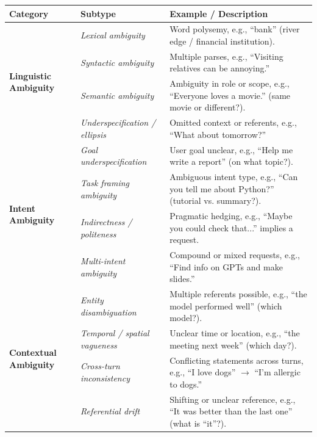 \documentclass[sigconf]{acmart}
\begin{document}
\iffalse
\begin{table}[t]
\centering
\small
\renewcommand{\arraystretch}{1.2}
\setlength{\tabcolsep}{8pt}
\begin{tabular}{p{3cm} p{4cm} p{7.5cm}}
\toprule
\textbf{Category} & \textbf{Subtype} & \textbf{Example / Description} \\
\midrule

\multirow{4}{*}{\textbf{Linguistic Ambiguity}} 
& \textit{Lexical ambiguity} & Word polysemy, e.g., ``bank'' (river edge / financial institution). \\
& \textit{Syntactic ambiguity} & Multiple parses, e.g., ``Visiting relatives can be annoying.'' \\
& \textit{Semantic ambiguity} & Ambiguity in role or scope, e.g., ``Everyone loves a movie.'' (same movie or different?). \\
& \textit{Underspecification / ellipsis} & Omitted context or referents, e.g., ``What about tomorrow?'' \\

\midrule

\multirow{4}{*}{\textbf{Intent Ambiguity}} 
& \textit{Goal underspecification} & User goal unclear, e.g., ``Help me write a report'' (on what topic?). \\
& \textit{Task framing ambiguity} & Ambiguous intent type, e.g., ``Can you tell me about Python?'' (tutorial vs. summary?). \\
& \textit{Indirectness / politeness} & Pragmatic hedging, e.g., ``Maybe you could check that...'' implies a request. \\
& \textit{Multi-intent ambiguity} & Compound or mixed requests, e.g., ``Find info on GPTs and make slides.'' \\

\midrule

\multirow{4}{*}{\textbf{Contextual Ambiguity}} 
& \textit{Entity disambiguation} & Multiple referents possible, e.g., ``the model performed well'' (which model?). \\
& \textit{Temporal / spatial vagueness} & Unclear time or location, e.g., ``the meeting next week'' (which day?). \\
& \textit{Cross-turn inconsistency} & Conflicting statements across turns, e.g., ``I love dogs'' $\rightarrow$ ``I'm allergic to dogs.'' \\
& \textit{Referential drift} & Shifting or unclear reference, e.g., ``It was better than the last one'' (what is “it”?). \\


\end{tabular}
\end{table}
\end{document}
